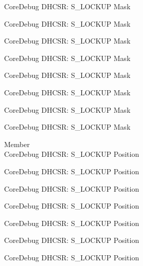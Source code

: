 \begin{DoxyRefList}
\label{deprecated__deprecated000681}%
%
Core\+Debug DHCSR\+: S\+\_\+\+LOCKUP Mask 

\label{deprecated__deprecated000773}%
%
Core\+Debug DHCSR\+: S\+\_\+\+LOCKUP Mask 

\label{deprecated__deprecated000827}%
%
Core\+Debug DHCSR\+: S\+\_\+\+LOCKUP Mask 

\label{deprecated__deprecated000912}%
%
Core\+Debug DHCSR\+: S\+\_\+\+LOCKUP Mask 

\label{deprecated__deprecated000969}%
%
Core\+Debug DHCSR\+: S\+\_\+\+LOCKUP Mask 

\label{deprecated__deprecated001045}%
%
Core\+Debug DHCSR\+: S\+\_\+\+LOCKUP Mask 

\label{deprecated__deprecated001132}%
%
Core\+Debug DHCSR\+: S\+\_\+\+LOCKUP Mask 

\label{deprecated__deprecated001234}%
%
Core\+Debug DHCSR\+: S\+\_\+\+LOCKUP Mask  
\item[Member \doxylink{group___c_m_s_i_s___core_debug_ga2900dd56a988a4ed27ad664d5642807e}{Core\+Debug\+\_\+\+DHCSR\+\_\+\+S\+\_\+\+LOCKUP\+\_\+\+Pos} ]\hfill \\
\label{deprecated__deprecated000021}%
%
Core\+Debug DHCSR\+: S\+\_\+\+LOCKUP Position 

\label{deprecated__deprecated000113}%
%
Core\+Debug DHCSR\+: S\+\_\+\+LOCKUP Position 

\label{deprecated__deprecated000167}%
%
Core\+Debug DHCSR\+: S\+\_\+\+LOCKUP Position 

\label{deprecated__deprecated000252}%
%
Core\+Debug DHCSR\+: S\+\_\+\+LOCKUP Position 

\label{deprecated__deprecated000309}%
%
Core\+Debug DHCSR\+: S\+\_\+\+LOCKUP Position 

\label{deprecated__deprecated000385}%
%
Core\+Debug DHCSR\+: S\+\_\+\+LOCKUP Position 

\label{deprecated__deprecated000472}%
%
Core\+Debug DHCSR\+: S\+\_\+\+LOCKUP Position 


\end{DoxyRefList}

